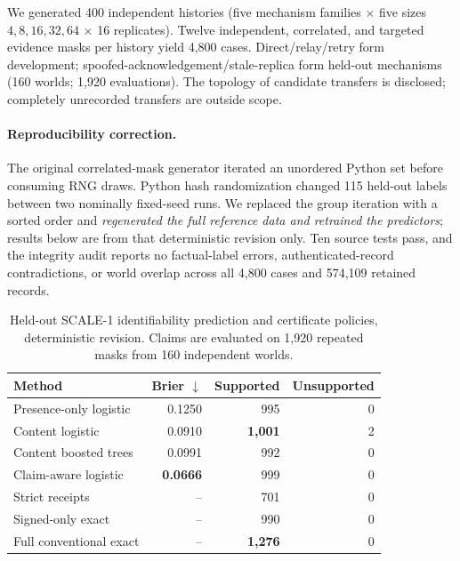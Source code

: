 \documentclass[10pt,twocolumn]{article}
\begin{document}
We generated 400 independent histories (five mechanism families $\times$ five sizes $4,8,16,32,64$ $\times$ 16 replicates). Twelve independent, correlated, and targeted evidence masks per history yield 4,800 cases. Direct/relay/retry form development; spoofed-acknowledgement/stale-replica form held-out mechanisms (160 worlds; 1,920 evaluations). The topology of candidate transfers is disclosed; completely unrecorded transfers are outside scope.

\paragraph{Reproducibility correction.} The original correlated-mask generator iterated an unordered Python set before consuming RNG draws. Python hash randomization changed 115 held-out labels between two nominally fixed-seed runs. We replaced the group iteration with a sorted order and \emph{regenerated the full reference data and retrained the predictors}; results below are from that deterministic revision only. Ten source tests pass, and the integrity audit reports no factual-label errors, authenticated-record contradictions, or world overlap across all 4,800 cases and 574,109 retained records.

\begin{table}[t]
\centering
\caption{Held-out SCALE-1 identifiability prediction and certificate policies, deterministic revision. Claims are evaluated on 1,920 repeated masks from 160 independent worlds.}
\label{tab:scale}
\setlength{\tabcolsep}{3.5pt}
\footnotesize
\begin{tabular}{@{}lrrr@{}}
\toprule
Method & Brier $\downarrow$ & Supported & Unsupported \\
\midrule
Presence-only logistic & 0.1250 & 995 & 0 \\
Content logistic & 0.0910 & \textbf{1,001} & 2 \\
Content boosted trees & 0.0991 & 992 & 0 \\
Claim-aware logistic & \textbf{0.0666} & 999 & 0 \\
\midrule
Strict receipts & -- & 701 & 0 \\
Signed-only exact & -- & 990 & 0 \\
Full conventional exact & -- & \textbf{1,276} & 0 \\
\bottomrule
\end{tabular}
\end{table}
\end{document}
